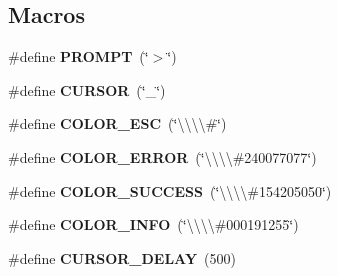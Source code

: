 \subsection*{Macros}
\begin{DoxyCompactItemize}
\item 
\#define {\bfseries P\+R\+O\+M\+PT}~(\char`\"{}$>$\char`\"{})\hypertarget{Console_8hh_accdbea14ea06c15e271784368bd993e8}{}\label{Console_8hh_accdbea14ea06c15e271784368bd993e8}

\item 
\#define {\bfseries C\+U\+R\+S\+OR}~(\char`\"{}\+\_\+\char`\"{})\hypertarget{Console_8hh_ae67dffdc8e496c16aff7e8903a3f2117}{}\label{Console_8hh_ae67dffdc8e496c16aff7e8903a3f2117}

\item 
\#define {\bfseries C\+O\+L\+O\+R\+\_\+\+E\+SC}~(\char`\"{}\textbackslash{}\textbackslash{}\textbackslash{}\textbackslash{}\#\char`\"{})\hypertarget{Console_8hh_ad35272f2bff654b0397a96776e9fc8b4}{}\label{Console_8hh_ad35272f2bff654b0397a96776e9fc8b4}

\item 
\#define {\bfseries C\+O\+L\+O\+R\+\_\+\+E\+R\+R\+OR}~(\char`\"{}\textbackslash{}\textbackslash{}\textbackslash{}\textbackslash{}\#240077077\char`\"{})\hypertarget{Console_8hh_ac7bab6591a09366d23b86d710ecc54af}{}\label{Console_8hh_ac7bab6591a09366d23b86d710ecc54af}

\item 
\#define {\bfseries C\+O\+L\+O\+R\+\_\+\+S\+U\+C\+C\+E\+SS}~(\char`\"{}\textbackslash{}\textbackslash{}\textbackslash{}\textbackslash{}\#154205050\char`\"{})\hypertarget{Console_8hh_a49ad0d2196700c1fa0a3a2a60dad41d3}{}\label{Console_8hh_a49ad0d2196700c1fa0a3a2a60dad41d3}

\item 
\#define {\bfseries C\+O\+L\+O\+R\+\_\+\+I\+N\+FO}~(\char`\"{}\textbackslash{}\textbackslash{}\textbackslash{}\textbackslash{}\#000191255\char`\"{})\hypertarget{Console_8hh_a0d4d3a685f9501631d1feed1f4ba7577}{}\label{Console_8hh_a0d4d3a685f9501631d1feed1f4ba7577}

\item 
\#define {\bfseries C\+U\+R\+S\+O\+R\+\_\+\+D\+E\+L\+AY}~(500)\hypertarget{Console_8hh_a59178e92910e3e77a4714bb1ced95909}{}\label{Console_8hh_a59178e92910e3e77a4714bb1ced95909}

\end{DoxyCompactItemize}
